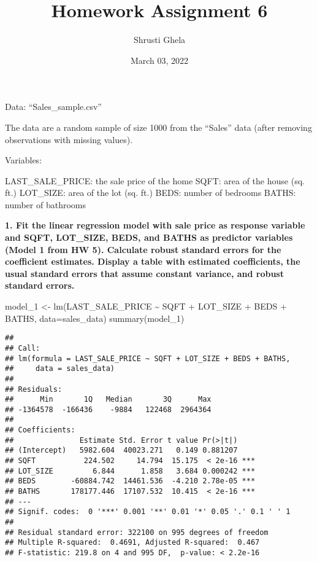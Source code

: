 \documentclass[
]{article}
\title{Homework Assignment 6}
\author{Shrusti Ghela}
\date{March 03, 2022}
\newenvironment{Shaded}{\begin{snugshade}}{\end{snugshade}}
\newcommand{\AttributeTok}[1]{\textcolor[rgb]{0.77,0.63,0.00}{#1}}
\newcommand{\FunctionTok}[1]{\textcolor[rgb]{0.00,0.00,0.00}{#1}}
\newcommand{\NormalTok}[1]{#1}
\newcommand{\OtherTok}[1]{\textcolor[rgb]{0.56,0.35,0.01}{#1}}
\newcommand{\SpecialCharTok}[1]{\textcolor[rgb]{0.00,0.00,0.00}{#1}}
\begin{document}
\maketitle

Data: ``Sales\_sample.csv''

The data are a random sample of size 1000 from the ``Sales'' data (after
removing observations with missing values).

Variables:

LAST\_SALE\_PRICE: the sale price of the home SQFT: area of the house
(sq. ft.) LOT\_SIZE: area of the lot (sq. ft.) BEDS: number of bedrooms
BATHS: number of bathrooms

\textbf{1. Fit the linear regression model with sale price as response
variable and SQFT, LOT\_SIZE, BEDS, and BATHS as predictor variables
(Model 1 from HW 5). Calculate robust standard errors for the
coefficient estimates. Display a table with estimated coefficients, the
usual standard errors that assume constant variance, and robust standard
errors. }

\begin{Shaded}
\begin{Highlighting}[]
\NormalTok{model\_1 }\OtherTok{\textless{}{-}} \FunctionTok{lm}\NormalTok{(LAST\_SALE\_PRICE }\SpecialCharTok{\textasciitilde{}}\NormalTok{ SQFT }\SpecialCharTok{+}\NormalTok{ LOT\_SIZE }\SpecialCharTok{+}\NormalTok{ BEDS }\SpecialCharTok{+}\NormalTok{ BATHS, }\AttributeTok{data=}\NormalTok{sales\_data)}
\FunctionTok{summary}\NormalTok{(model\_1)}
\end{Highlighting}
\end{Shaded}

\begin{verbatim}
## 
## Call:
## lm(formula = LAST_SALE_PRICE ~ SQFT + LOT_SIZE + BEDS + BATHS, 
##     data = sales_data)
## 
## Residuals:
##      Min       1Q   Median       3Q      Max 
## -1364578  -166436    -9884   122468  2964364 
## 
## Coefficients:
##               Estimate Std. Error t value Pr(>|t|)    
## (Intercept)   5982.604  40023.271   0.149 0.881207    
## SQFT           224.502     14.794  15.175  < 2e-16 ***
## LOT_SIZE         6.844      1.858   3.684 0.000242 ***
## BEDS        -60884.742  14461.536  -4.210 2.78e-05 ***
## BATHS       178177.446  17107.532  10.415  < 2e-16 ***
## ---
## Signif. codes:  0 '***' 0.001 '**' 0.01 '*' 0.05 '.' 0.1 ' ' 1
## 
## Residual standard error: 322100 on 995 degrees of freedom
## Multiple R-squared:  0.4691, Adjusted R-squared:  0.467 
## F-statistic: 219.8 on 4 and 995 DF,  p-value: < 2.2e-16
\end{verbatim}
\end{document}
